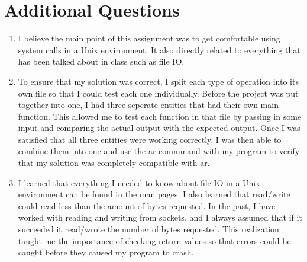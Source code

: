 \documentclass{article}
\begin{document}
\section{Additional Questions}
\begin{enumerate}
\item I believe the main point of this assignment was to get comfortable using system calls in a Unix environment.  It also directly related to everything that has been talked about in class such as file IO.
\item To ensure that my solution was correct, I split each type of operation into its own file so that I could test each one individually.  Before the project was put together into one, I had three seperate entities that had their own main function.  This allowed me to test each function in that file by passing in some input and comparing the actual output with the expected output.  Once I was satisfied that all three entities were working correctly, I was then able to combine them into one and use the ar commmand with my program to verify that my solution was completely compatible with ar.
\item I learned that everything I needed to know about file IO in a Unix environment can be found in the man pages.  I also learned that read/write could read less than the amount of bytes requested.  In the past, I have worked with reading and writing from sockets, and I always assumed that if it succeeded it read/wrote the number of bytes requested.  This realization taught me the importance of checking return values so that errors could be caught before they caused my program to crash.
\end{enumerate}
\end{document}
